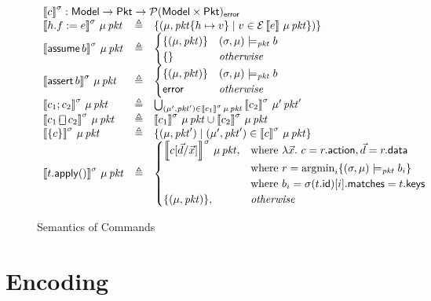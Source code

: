 \documentclass{article}
\newcommand{\pkt}{\mathit{pkt}}
\newcommand{\error}{\mathsf{error}}
\newcommand{\denote}[1]{\left\llbracket#1\right\rrbracket}
\newcommand{\edenote}[1]{\mathcal{E}\denote{#1}}
\newcommand{\Pkt}{\mathsf{Pkt}}
\newcommand{\Model}{\mathsf{Model}}
\newcommand{\matches}{\mathsf{matches}}
\newcommand{\action}{\mathsf{action}}
\newcommand{\keys}{\mathsf{keys}}
\newcommand{\data}{\mathsf{data}}
\newcommand{\id}{\mathsf{id}}
\newcommand{\assert}{\mathop{\mathsf{assert}}}
\newcommand{\assume}{\mathop{\mathsf{assume}}}
\newcommand{\apply}{\mathsf{apply}}
\newcommand{\choiceop}{\rotatebox[origin=c]{90}{$\sqsubset\!\!\!\sqsupset$}}
\newcommand{\choice}{\mathbin{\choiceop}}
\newcommand{\argmin}{\mathop{\textrm{argmin}}}
\newcommand{\satisfy}[3]{({#1,#3}) \models_{#2}}
\begin{document}
\begin{figure}[htp]
  \[\begin{array}{l >{\triangleq}cl}
  \multicolumn{3}{l}{\denote{c}^\sigma : \Model \to \Pkt \to \mathcal{P}(\Model \times \Pkt)_\error }\\
    \denote{h.f := e}^\sigma\,\mu\,\pkt && \{(\mu, \pkt\{h \mapsto v\} \mid v \in \edenote{e}\,\mu\,\pkt\})\} \\
    \denote{\assume b}^\sigma\,\mu\,\pkt &&
    \begin{cases}
      \{(\mu,\pkt)\} & \satisfy \sigma \pkt \mu b \\
      \{\} & \textit{otherwise} \\
    \end{cases}\\
    \denote{\assert b}^\sigma\,\mu\,\pkt &&
    \begin{cases}
      \{(\mu,\pkt)\} & \satisfy \sigma \pkt \mu b \\
      \error & \textit{otherwise}
    \end{cases} \\
    \denote{c_1;c_2}^\sigma\,\mu\,\pkt&&
    \bigcup_{(\mu',\pkt') \in \denote{c_1}^\sigma\,\mu\,\pkt}\denote{c_2}^\sigma\,\mu'\,\pkt' \\
    \denote{c_1 \choice c_2}^\sigma\,\mu\,\pkt &&
    \denote{c_1}^\sigma\,\mu\,\pkt \cup \denote{c_2}^\sigma\,\mu\,\pkt \\
    \denote{\{c\}}^\sigma\,\mu\,\pkt &&
    \{(\mu,\pkt') \mid (\mu',\pkt') \in \denote{c}^\sigma\,\mu\,\pkt \}\\
    \denote{t.\apply()}^\sigma\,\mu\,\pkt &&
    \begin{cases}
      \denote{c[\vec d/\vec x]}^\sigma\,\mu\,\pkt,
      & \text{where}~\lambda \vec x.~c = r.\action, \vec d = r.\data \\
      & \text{where}~r = \argmin_i\{\satisfy \sigma \pkt \mu b_i\} \\
      & \text{where}~b_i = \sigma(t.\id)[i].\matches = t.\keys \\
      \{(\mu,\pkt)\}, & \mathit{otherwise}
    \end{cases}
  \end{array}\]
  \caption{Semantics of Commands}
  \label{fig:com-sem}
\end{figure}

\section{Encoding}
\end{document}
